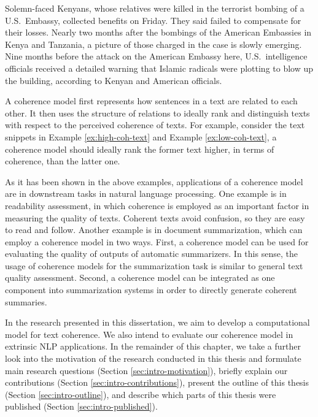 \begin{examples}
\label{ex:low-coh-text}
Solemn-faced Kenyans, whose relatives were killed in the terrorist bombing of a U.S.\ Embassy, collected benefits on Friday. 
They said failed to compensate for their losses. 
Nearly two months after the bombings of the American Embassies in Kenya and Tanzania, a picture of those charged in the case is slowly emerging. 
Nine months before the attack on the American Embassy here, U.S.\ intelligence officials received a detailed warning that Islamic radicals were plotting to blow up the building, according to Kenyan and American officials. 
\end{examples}

A coherence model first represents how sentences in a text are related to each other. 
It then uses the structure of relations to ideally rank and distinguish texts with respect to the perceived coherence of texts. 
For example, consider the text snippets in Example \ref{ex:high-coh-text} and Example \ref{ex:low-coh-text}, a coherence model should ideally rank the former text higher, in terms of coherence, than the latter one. 

As it has been shown in the above examples, applications of a coherence model are in downstream tasks in natural language processing. 
One example is in readability assessment, in which coherence is employed as an important factor in measuring the quality of texts. 
Coherent texts avoid confusion, so they are easy to read and follow. 
Another example is in document summarization, which can employ a coherence model in two ways.  
First, a coherence model can be used for evaluating the quality of outputs of automatic summarizers. 
In this sense, the usage of coherence models for the summarization task is similar to general text quality assessment. 
Second, a coherence model can be integrated as one component into summarization systems in order to directly generate coherent summaries. 


In the research presented in this dissertation, we aim to develop a computational model for text coherence. 
We also intend to evaluate our coherence model in extrinsic NLP applications. 
In the remainder of this chapter, we take a further look into the motivation of the research conducted in this thesis and formulate main research questions (Section \ref{sec:intro-motivation}), briefly explain our contributions (Section \ref{sec:intro-contributions}), present the outline of this thesis (Section \ref{sec:intro-outline}), and describe which parts of this thesis were published (Section \ref{sec:intro-published}). 

